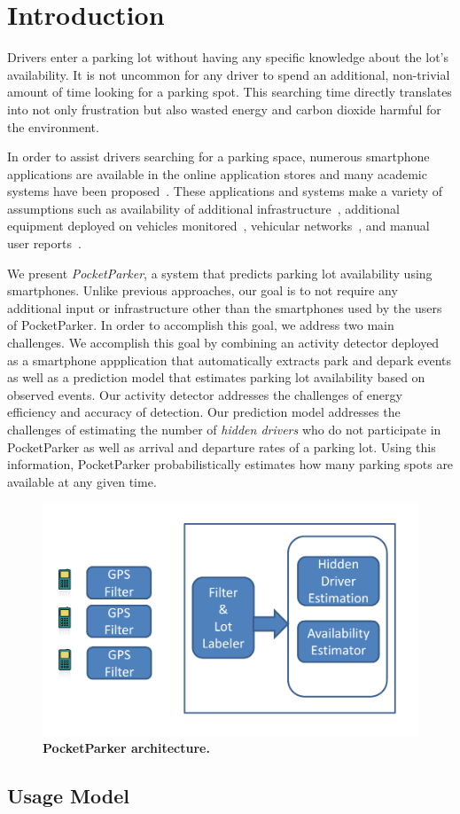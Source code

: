 \section{Introduction}

Drivers enter a parking lot without having any specific knowledge about the
lot's availability. It is not uncommon for any driver to spend an additional,
non-trivial amount of time looking for a parking spot. This searching time
directly translates into not only frustration but also wasted energy and carbon
dioxide harmful for the environment.

In order to assist drivers searching for a parking space, numerous smartphone
applications are available in the online application stores and many academic
systems have been proposed~\cite{4212497, Chen:2012:COS, Delot:2009:CRP,
5062057, Mathur:2010:PDS}. These applications and systems make a variety of
assumptions such as availability of additional infrastructure~\cite{5062057},
additional equipment deployed on vehicles monitored~\cite{Mathur:2010:PDS},
vehicular networks~\cite{Delot:2009:CRP, Mathur:2010:PDS, 4212497}, and manual
user reports~\cite{Chen:2012:COS}.

We present {\it PocketParker}, a system that predicts parking lot availability
using smartphones. Unlike previous approaches, our goal is to not require any
additional input or infrastructure other than the smartphones used by the users
of PocketParker. In order to accomplish this goal, we address two main
challenges. We accomplish this goal by combining an activity detector
deployed as a smartphone appplication that automatically extracts park and
depark events as well as a prediction model that estimates parking lot
availability based on observed events. Our activity detector addresses the
challenges of energy efficiency and accuracy of detection. Our prediction model
addresses the challenges of estimating the number of {\it hidden drivers} who do
not participate in PocketParker as well as arrival and departure rates of a
parking lot. Using this information, PocketParker probabilistically estimates
how many parking spots are available at any given time.

\begin{figure}
\centering
\includegraphics[width=\columnwidth]{./figures/blockdiagram.pdf}

\caption{\textbf{PocketParker architecture.}}

\label{fig-arch}
\end{figure}

\subsection{Usage Model}
